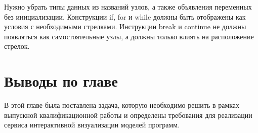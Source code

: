 Нужно убрать типы данных из названий узлов, а также объявления переменных без инициализации. Конструкции if, for и while должны быть отображены как условия с необходимыми стрелками. Инструкции break и continue не должны появляться как самостоятельные узлы, а должны только влиять на расположение стрелок.
\section{Выводы по главе} \label{ch3:sec3}
В этой главе была поставлена задача, которую необходимо решить в рамках выпускной квалификационной работы и определены требования для реализации сервиса интерактивной визуализации моделей программ.
\newpage





%	
%
%
%
%
%
%
%
